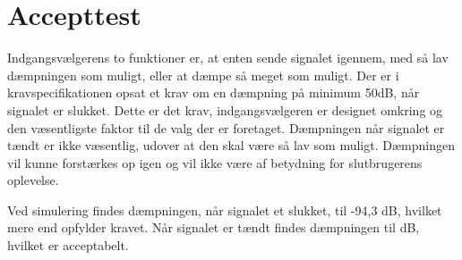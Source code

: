 \section{Accepttest}
Indgangsvælgerens to funktioner er, at enten sende signalet igennem, med så lav dæmpningen som muligt, eller at dæmpe så meget som muligt. Der er i kravspecifikationen opsat et krav om en dæmpning på minimum 50dB, når signalet er slukket. Dette er det krav, indgangsvælgeren er designet omkring og den væsentligste faktor til de valg der er foretaget. Dæmpningen når signalet er tændt er ikke væsentlig, udover at den skal være så lav som muligt. Dæmpningen vil kunne forstærkes op igen og vil ikke være af betydning for slutbrugerens oplevelse.

Ved simulering findes dæmpningen, når signalet et slukket, til -94,3 dB, hvilket mere end opfylder kravet. Når signalet er tændt findes dæmpningen til dB, hvilket er acceptabelt.